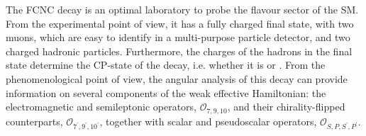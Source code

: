 The FCNC decay \BtoKstmumudecay is an optimal laboratory to probe the flavour sector of the SM.
From the experimental point of view, it has a fully charged final state, with two muons, which are easy to identify in a multi-purpose particle detector, and two charged hadronic particles.
Furthermore, the charges of the hadrons in the final state determine the CP-state of the decay, i.e. whether it is \BtoKstmumudecay or \BtoKstmumuconjdecay.
From the phenomenological point of view, the angular analysis of this decay can provide information on several components of the weak effective Hamiltonian: the electromagnetic and semileptonic operators, $\mathcal{O}_{7,9,10}$, and their chirality-flipped counterparts, $\mathcal{O}_{7^\prime,9^\prime,10^\prime}$, together with scalar and pseudoscalar operators, $\mathcal{O}_{S,P,S^\prime,P^\prime}$.


